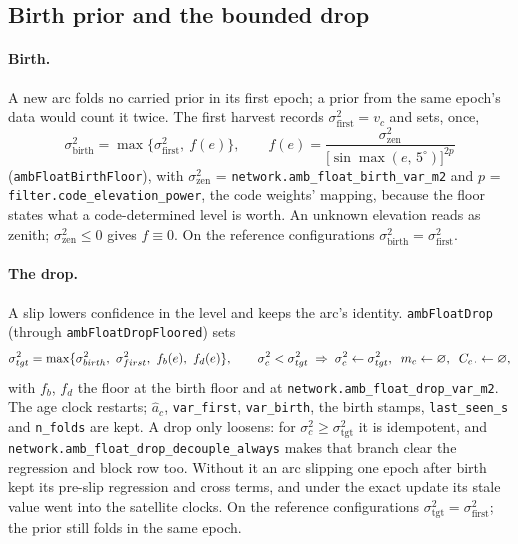 \documentclass[main.tex]{subfiles}
\begin{document}
\subsection{Birth prior and the bounded drop}
\label{sec:net-vehicle-drop}

\paragraph{Birth.}
A new arc folds no carried prior in its first epoch; a prior from the
same epoch's data would count it twice. The first harvest records
$\sigma^2_{\mathrm{first}} = v_c$ and sets, once,
\begin{equation}
\sigma^2_{\mathrm{birth}} = \max\{\sigma^2_{\mathrm{first}},\ f(e)\},
\qquad
f(e) = \frac{\sigma^2_{\mathrm{zen}}}{\big[\sin\max(e,\,5^\circ)\big]^{2p}}
\label{eq:veh-floor}
\end{equation}
(\texttt{ambFloatBirthFloor}), with $\sigma^2_{\mathrm{zen}}$ =
\texttt{network.amb\_float\_birth\_var\_m2} and $p$ =
\texttt{filter.code\_elevation\_power}, the code weights' mapping, because
the floor states what a code-determined level is worth. An unknown
elevation reads as zenith; $\sigma^2_{\mathrm{zen}} \le 0$ gives $f \equiv
0$. On the reference configurations $\sigma^2_{\mathrm{birth}} =
\sigma^2_{\mathrm{first}}$.

\paragraph{The drop.}
A slip lowers confidence in the level and keeps the arc's identity.
\texttt{ambFloatDrop} (through \texttt{ambFloatDropFloored}) sets
\begin{equation}
\sigma^2_{\mathrm{tgt}} = \max\{\sigma^2_{\mathrm{birth}},\ \sigma^2_{\mathrm{first}},\ f_b(e),\ f_d(e)\},
\qquad
\sigma_c^2 < \sigma^2_{\mathrm{tgt}} \;\Rightarrow\;
\sigma_c^2 \leftarrow \sigma^2_{\mathrm{tgt}},\;\;
\vehM{c} \leftarrow \varnothing,\;\;
C_{c\,\cdot} \leftarrow \varnothing ,
\label{eq:veh-drop}
\end{equation}
with $f_b$, $f_d$ the floor at the birth floor and at
\texttt{network.amb\_float\_drop\_var\_m2}. The age clock restarts;
$\hat a_c$, \texttt{var\_first}, \texttt{var\_birth}, the birth stamps,
\texttt{last\_seen\_s} and \texttt{n\_folds} are kept. A drop only loosens:
for $\sigma_c^2 \ge \sigma^2_{\mathrm{tgt}}$ it is idempotent, and
\texttt{network.amb\_float\_drop\_decouple\_always} makes that branch clear
the regression and block row too. Without it an arc slipping one epoch
after birth kept its pre-slip regression and cross terms, and under the
exact update its stale value went into the satellite clocks. On the
reference configurations $\sigma^2_{\mathrm{tgt}} = \sigma^2_{\mathrm{first}}$;
the prior still folds in the same epoch.
\end{document}
